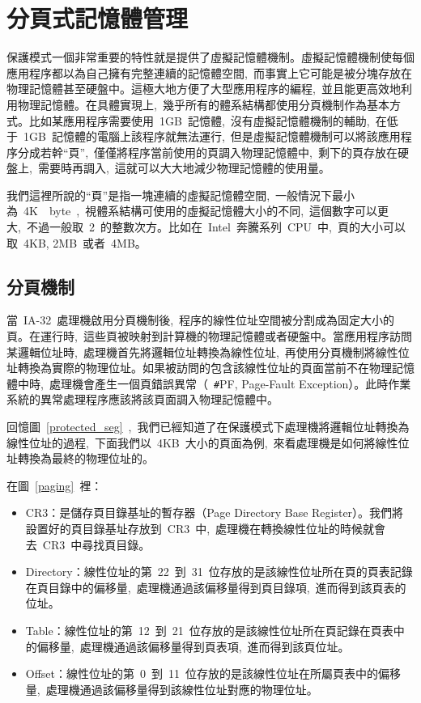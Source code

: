 \section{分頁式記憶體管理}

保護模式一個非常重要的特性就是提供了虛擬記憶體機制。虛擬記憶體機制使每個應用程序都以為自己擁有完整連續的記憶體空間,~而事實上它可能是被分塊存放在物理記憶體甚至硬盤中。這極大地方便了大型應用程序的編程,~並且能更高效地利用物理記憶體。在具體實現上,~幾乎所有的體系結構都使用分頁機制作為基本方式。比如某應用程序需要使用~1GB~記憶體,~沒有虛擬記憶體機制的輔助,~在低于~1GB~記憶體的電腦上該程序就無法運行,~但是虛擬記憶體機制可以將該應用程序分成若幹“頁”,~僅僅將程序當前使用的頁調入物理記憶體中,~剩下的頁存放在硬盤上,~需要時再調入,~這就可以大大地減少物理記憶體的使用量。

我們這裡所說的“頁”是指一塊連續的虛擬記憶體空間,~一般情況下最小為~4K~~byte~,~視體系結構可使用的虛擬記憶體大小的不同,~這個數字可以更大,~不過一般取~2~的整數次方。比如在~Intel~奔騰系列~CPU~中,~頁的大小可以取~4KB, 2MB~或者~4MB。

\subsection{分頁機制}

當~IA-32~處理機啟用分頁機制後,~程序的線性位址空間被分割成為固定大小的頁。在運行時,~這些頁被映射到計算機的物理記憶體或者硬盤中。當應用程序訪問某邏輯位址時,~處理機首先將邏輯位址轉換為線性位址,~再使用分頁機制將線性位址轉換為實際的物理位址。如果被訪問的包含該線性位址的頁面當前不在物理記憶體中時,~處理機會產生一個頁錯誤異常（~\texttt{\#}PF, Page-Fault Exception）。此時作業系統的異常處理程序應該將該頁面調入物理記憶體中。

回憶圖~\ref{protected_seg}~,~我們已經知道了在保護模式下處理機將邏輯位址轉換為線性位址的過程,~下面我們以~4KB~大小的頁面為例,~來看處理機是如何將線性位址轉換為最終的物理位址的。


在圖~\ref{paging}~裡：
\begin{itemize}
\item CR3：是儲存頁目錄基址的暫存器（Page Directory Base Register）。我們將設置好的頁目錄基址存放到~CR3~中,~處理機在轉換線性位址的時候就會去~CR3~中尋找頁目錄。
\item Directory：線性位址的第~22~到~31~位存放的是該線性位址所在頁的頁表記錄在頁目錄中的偏移量,~處理機通過該偏移量得到頁目錄項,~進而得到該頁表的位址。
\item Table：線性位址的第~12~到~21~位存放的是該線性位址所在頁記錄在頁表中的偏移量,~處理機通過該偏移量得到頁表項,~進而得到該頁位址。
\item Offset：線性位址的第~0~到~11~位存放的是該線性位址在所屬頁表中的偏移量,~處理機通過該偏移量得到該線性位址對應的物理位址。
\end{itemize}


